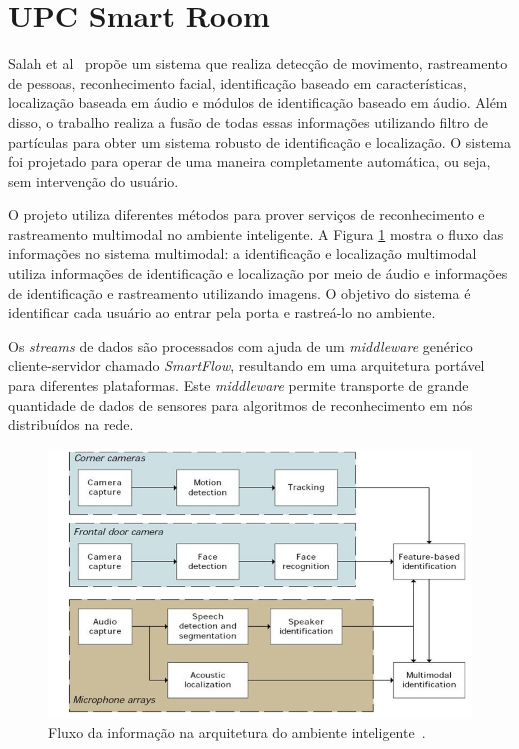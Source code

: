 
\section{UPC Smart Room}

Salah et al~\cite{salah} propõe um sistema que realiza detecção de movimento, rastreamento de pessoas, reconhecimento facial, identificação baseado em características, localização baseada em áudio e módulos de identificação baseado em áudio. Além disso, o trabalho realiza a fusão de todas essas informações utilizando filtro de partículas para obter um sistema robusto de identificação e localização. O sistema foi projetado para operar de uma maneira completamente automática, ou seja, sem intervenção do usuário.

O projeto utiliza diferentes métodos para prover serviços de reconhecimento e rastreamento multimodal no ambiente inteligente. A Figura \ref{workflow} mostra o fluxo das informações no sistema multimodal: a identificação e localização multimodal utiliza informações de identificação e localização por meio de áudio e informações de identificação e rastreamento utilizando imagens. O objetivo do sistema é identificar cada usuário ao entrar pela porta e rastreá-lo no ambiente. 

Os \textit{streams} de dados são processados com ajuda de um \textit{middleware} genérico cliente-servidor chamado \textit{SmartFlow}, resultando em uma arquitetura portável para diferentes plataformas. Este \textit{middleware} permite transporte de grande quantidade de dados de sensores para algoritmos de reconhecimento em nós distribuídos na rede.

	\begin{figure}[hbt]
		\begin{center}
			\includegraphics[scale=0.5]{figuras/3.TrabalhosCorrelatos/workflow.png}
		\end{center}
		\caption{Fluxo da informação na arquitetura do ambiente inteligente~\cite{salah}.}
		\label{workflow}
	\end{figure}

